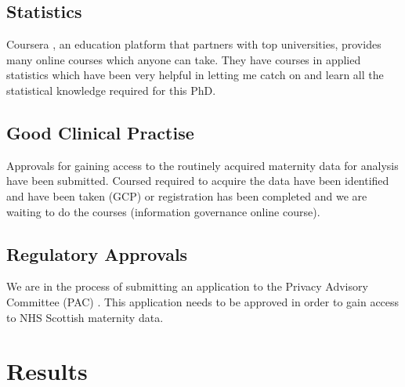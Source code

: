 \documentclass[bsc]{abdnthesis}
\begin{document}
\section{Statistics} %
\label{sec:statistics}
Coursera \cite{coursera}, an education platform that partners with top universities, provides many online courses which anyone can take. They have courses in applied statistics which have been very helpful in letting me catch on and learn all the statistical knowledge required for this PhD. 
\section{Good Clinical Practise} %
\label{sec:good_clinical_practise}
Approvals for gaining access to the routinely acquired maternity data for analysis have been submitted. Coursed required to acquire the data have been identified and have been taken (GCP) or registration has been completed and we are waiting to do the courses (information governance online course).
\section{Regulatory Approvals} %
\label{sec:pac_application}
We are in the process of submitting an application to the Privacy Advisory Committee (PAC) \cite{pac}. This application needs to be approved in order to gain access to NHS Scottish  maternity data. 


\chapter{Results}
\end{document}
